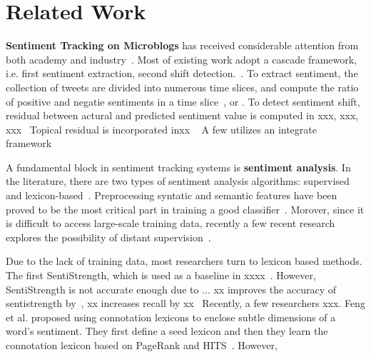 \documentclass[runningheads]{llncs}
\begin{document}
\section{Related Work}\label{sec:related}
\textbf{Sentiment Tracking on Microblogs} has received considerable attention from both academy and industry~\cite{}.%
Most of existing work adopt a cascade framework, i.e. first sentiment extraction, second shift detection.~\cite{}.%
To extract sentiment, the collection of tweets are divided into numerous time slices, and compute the ratio of positive and negatie sentiments in a time slice~\cite{}, or . %
To detect sentiment shift, residual between actural and predicted sentiment value is computed in xxx, xxx, xxx~\cite{Giachanou2016sentitime}%
Topical residual is incorporated inxx ~\cite{}%
A few utilizes an integrate framework ~\cite{}%

A fundamental block in sentiment tracking systems is \textbf{sentiment analysis}. 
In the literature, there are two types of sentiment analysis algorithms: supervised  and lexicon-based~\cite{Ahmed2017SentiCR}.
Preprocessing syntatic and semantic features have been proved to be the most critical part in training a good classifier~\cite{}. %
Morover, since it is difficult to access large-scale training data, recently a few recent research explores the possibility of distant supervision~\cite{}. 

Due to the lack of training data, most researchers turn to lexicon based methods.%
The first  SentiStrength, which is used as a baseline in xxxx~\cite{}.%
However, SentiStrength is not accurate enough due to ...%
xx improves the accuracy of sentistrength by~\cite{}, xx increases recall by xx~\cite{}  %
Recently, a few researchers xxx. Feng et al. proposed using connotation lexicons to enclose subtle dimensions of a word’s sentiment. They first define a seed lexicon and then they learn the connotation lexicon based on PageRank and HITS~\cite{Feng2011lexicon}.%
However, %
\end{document}
